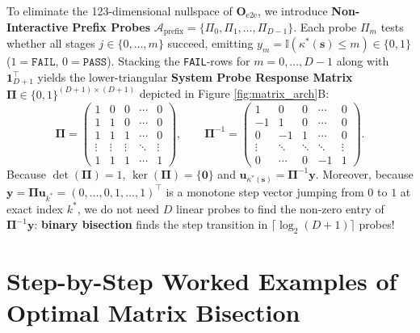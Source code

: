 \documentclass[11pt,a4paper]{article}
\theoremstyle{definition}
\theoremstyle{remark}
\begin{document}
To eliminate the 123-dimensional nullspace of $\mathbf{O}_{\text{e2e}}$, we introduce \textbf{Non-Interactive Prefix Probes} $\mathcal{A}_{\text{prefix}} = \{\Pi_0, \Pi_1, \dots, \Pi_{D-1}\}$. Each probe $\Pi_m$ tests whether all stages $j \in \{0, \dots, m\}$ succeed, emitting $y_m = \mathbb{I}(\kappa^*(\bm{s}) \le m) \in \{0, 1\}$ ($1 = \texttt{FAIL}$, $0 = \texttt{PASS}$). Stacking the \texttt{FAIL}-rows for $m = 0, \dots, D-1$ along with $\bm{1}_{D+1}^\top$ yields the lower-triangular \textbf{System Probe Response Matrix} $\mathbf{\Pi} \in \{0,1\}^{(D+1)\times(D+1)}$ depicted in Figure \ref{fig:matrix_arch}B:
\begin{equation}
    \mathbf{\Pi} = \begin{pmatrix}
        1 & 0 & 0 & \cdots & 0 \\
        1 & 1 & 0 & \cdots & 0 \\
        1 & 1 & 1 & \cdots & 0 \\
        \vdots & \vdots & \vdots & \ddots & \vdots \\
        1 & 1 & 1 & \cdots & 1
    \end{pmatrix}, \qquad
    \mathbf{\Pi}^{-1} = \begin{pmatrix}
        1 & 0 & 0 & \cdots & 0 \\
        -1 & 1 & 0 & \cdots & 0 \\
        0 & -1 & 1 & \cdots & 0 \\
        \vdots & \ddots & \ddots & \ddots & \vdots \\
        0 & \cdots & 0 & -1 & 1
    \end{pmatrix}.
\end{equation}
Because $\det(\mathbf{\Pi}) = 1$, $\ker(\mathbf{\Pi}) = \{\bm{0}\}$ and $\bm{u}_{\kappa^*(\bm{s})} = \mathbf{\Pi}^{-1}\bm{y}$. Moreover, because $\bm{y} = \mathbf{\Pi}\bm{u}_{k^*} = (0,\dots,0,1,\dots,1)^\top$ is a monotone step vector jumping from $0$ to $1$ at exact index $k^*$, we do not need $D$ linear probes to find the non-zero entry of $\mathbf{\Pi}^{-1}\bm{y}$: \textbf{binary bisection} finds the step transition in $\lceil \log_2(D+1) \rceil$ probes!

\section{Step-by-Step Worked Examples of Optimal Matrix Bisection}
\end{document}
